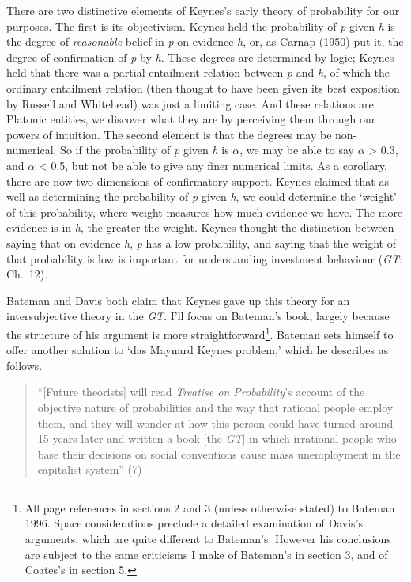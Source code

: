 \documentclass[noflushend]{philosophersimprint}
\begin{document}
There are two distinctive elements of Keynes's early theory of
probability for our purposes. The first is its objectivism. Keynes held
the probability of \emph{p} given \emph{h} is the degree of
\emph{reasonable} belief in \emph{p} on evidence \emph{h}, or, as Carnap
(1950) put it, the degree of confirmation of \emph{p} by \emph{h}. These
degrees are determined by logic; Keynes held that there was a partial
entailment relation between \emph{p} and \emph{h}, of which the ordinary
entailment relation (then thought to have been given its best exposition
by Russell and Whitehead) was just a limiting case. And these relations
are Platonic entities, we discover what they are by perceiving them
through our powers of intuition. The second element is that the degrees
may be non-numerical. So if the probability of \emph{p} given \emph{h}
is \({\alpha}\), we may be able to say \({\alpha}\) \textgreater{} 0.3,
and \({\alpha}\) \textless{} 0.5, but not be able to give any finer
numerical limits. As a corollary, there are now two dimensions of
confirmatory support. Keynes claimed that as well as determining the
probability of \emph{p} given \emph{h}, we could determine the `weight'
of this probability, where weight measures how much evidence we have.
The more evidence is in \emph{h}, the greater the weight. Keynes thought
the distinction between saying that on evidence \emph{h}, \emph{p} has a
low probability, and saying that the weight of that probability is low
is important for understanding investment behaviour (\emph{GT}: Ch.~12).

Bateman and Davis both claim that Keynes gave up this theory for an
intersubjective theory in the \emph{GT}. I'll focus on Bateman's book,
largely because the structure of his argument is more
straightforward\footnote{All page references in sections 2 and 3 (unless
  otherwise stated) to Bateman 1996. Space considerations preclude a
  detailed examination of Davis's arguments, which are quite different
  to Bateman's. However his conclusions are subject to the same
  criticisms I make of Bateman's in section 3, and of Coates's in
  section 5.}. Bateman sets himself to offer another solution to `das
Maynard Keynes problem,' which he describes as follows.

\begin{quote}
``{[}Future theorists{]} will read \emph{Treatise on Probability}'s
account of the objective nature of probabilities and the way that
rational people employ them, and they will wonder at how this person
could have turned around 15 years later and written a book {[}the
\emph{GT}{]} in which irrational people who base their decisions on
social conventions cause mass unemployment in the capitalist system''
(7)
\end{quote}
\end{document}

